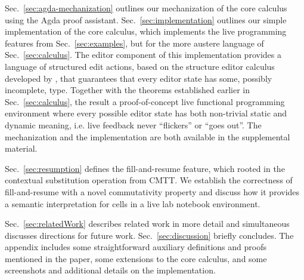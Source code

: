 Sec.~\ref{sec:agda-mechanization} outlines our mechanization of the core calculus using the Agda proof assistant. 
Sec.~\ref{sec:implementation} outlines our simple implementation of the core calculus, which implements the live programming features from Sec.~\ref{sec:examples},
but for the more austere language of Sec.~\ref{sec:calculus}. 
The editor component of this implementation provides a language of structured edit actions, 
based on the \Hazelnut structure editor calculus developed by \cite{popl-paper}, that guarantees that
every editor state has some, possibly incomplete, type. 
Together with the theorems established earlier in Sec.~\ref{sec:calculus}, the result \IS a proof-of-concept
live functional programming environment where every possible editor state has both non-trivial static and dynamic 
meaning, i.e. live feedback never ``flickers'' or ``goes out''. 
The mechanization and the implementation are both available in the supplemental material.

Sec.~\ref{sec:resumption} defines the fill-and-resume feature, which \IS rooted in the contextual substitution operation from CMTT. We establish the correctness of fill-and-resume with a novel commutativity property and discuss how it provides a semantic interpretation for cells in a live lab notebook environment.

Sec.~\ref{sec:relatedWork} describes related work in more detail and simultaneous discusses directions for future work. Sec.~\ref{sec:discussion} briefly concludes. The appendix includes some straightforward auxiliary definitions and proofs mentioned in the paper, some extensions to the core calculus, and some screenshots and additional details on the implementation. 
